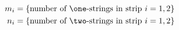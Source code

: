 \begin{equation}
\begin{split}
m_i&=\text{\{number of \one-strings in strip $i=1,2$\}}\\
n_i&=\text{\{number of \two-strings in strip $i=1,2$\}}
\end{split}
\label{stringdefs}
\end{equation}

